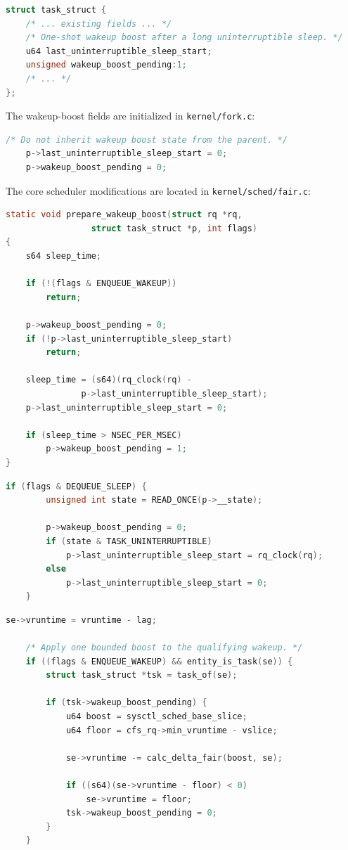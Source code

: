 \documentclass[11pt, a4paper]{article}
\begin{document}
\begin{lstlisting}[language=C, caption=Changes to include/linux/sched.h]
struct task_struct {
	/* ... existing fields ... */
	/* One-shot wakeup boost after a long uninterruptible sleep. */
	u64 last_uninterruptible_sleep_start;
	unsigned wakeup_boost_pending:1;
	/* ... */
};
\end{lstlisting}

The wakeup-boost fields are initialized in \texttt{kernel/fork.c}:

\begin{lstlisting}[language=C, caption=Changes to kernel/fork.c]
	/* Do not inherit wakeup boost state from the parent. */
	p->last_uninterruptible_sleep_start = 0;
	p->wakeup_boost_pending = 0;
\end{lstlisting}

The core scheduler modifications are located in \texttt{kernel/sched/fair.c}:

\begin{lstlisting}[language=C, caption=Wakeup qualification in kernel/sched/fair.c]
static void prepare_wakeup_boost(struct rq *rq,
				 struct task_struct *p, int flags)
{
	s64 sleep_time;

	if (!(flags & ENQUEUE_WAKEUP))
		return;

	p->wakeup_boost_pending = 0;
	if (!p->last_uninterruptible_sleep_start)
		return;

	sleep_time = (s64)(rq_clock(rq) -
			   p->last_uninterruptible_sleep_start);
	p->last_uninterruptible_sleep_start = 0;

	if (sleep_time > NSEC_PER_MSEC)
		p->wakeup_boost_pending = 1;
}
\end{lstlisting}

\begin{lstlisting}[language=C, caption=Sleep timestamp in dequeue\_task\_fair]
	if (flags & DEQUEUE_SLEEP) {
		unsigned int state = READ_ONCE(p->__state);

		p->wakeup_boost_pending = 0;
		if (state & TASK_UNINTERRUPTIBLE)
			p->last_uninterruptible_sleep_start = rq_clock(rq);
		else
			p->last_uninterruptible_sleep_start = 0;
	}
\end{lstlisting}

\begin{lstlisting}[language=C, caption=Changes to place\_entity in kernel/sched/fair.c]
	se->vruntime = vruntime - lag;

	/* Apply one bounded boost to the qualifying wakeup. */
	if ((flags & ENQUEUE_WAKEUP) && entity_is_task(se)) {
		struct task_struct *tsk = task_of(se);

		if (tsk->wakeup_boost_pending) {
			u64 boost = sysctl_sched_base_slice;
			u64 floor = cfs_rq->min_vruntime - vslice;

			se->vruntime -= calc_delta_fair(boost, se);

			if ((s64)(se->vruntime - floor) < 0)
				se->vruntime = floor;
			tsk->wakeup_boost_pending = 0;
		}
	}
\end{lstlisting}
\end{document}

